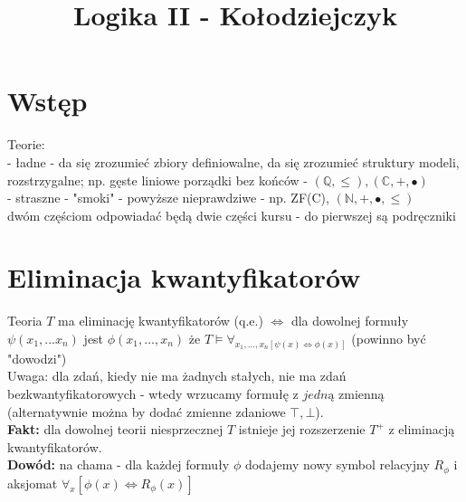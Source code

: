 \documentclass[12pt]{article}
\title{\textbf{Logika II - Ko\l odziejczyk}}
\date{}
\begin{document}
\maketitle
\setlength{\parindent}{0cm}



\newcommand{\M}{\mathfrak{M}}
\newcommand{\N}{\mathbb{N}}
\newcommand{\X}{\mathcal{X}}
\newcommand{\ind}{\setlength{\parindent}{1cm}  \indent \setlength{\parindent}{0cm}}
\newcommand{\sss}{\mathbb{S}}
\newcommand{\U}{\mathcal{U}}
\newcommand{\Q}{\mathbb{Q}}
\newcommand{\C}{\mathbb{C}}
\newcommand{\om}{\omega}



\section{Wstęp}

Teorie:\\
- ładne - da się zrozumieć zbiory definiowalne, da się zrozumieć struktury modeli, rozstrzygalne; np. gęste liniowe porządki bez końców - $(\Q, \leq), (\C,+, \bullet)$ \\
- straszne - "smoki" - powyższe nieprawdziwe - np. ZF(C), $(\N, +, \bullet, \leq)$\\

dwóm częściom odpowiadać będą dwie części kursu - do pierwszej są podręczniki












\section{Eliminacja kwantyfikatorów}
Teoria $T$ ma eliminację kwantyfikatorów (q.e.) $\iff$ dla dowolnej formuły $\psi(x_1,...x_n)$ jest $\phi(x_1,...,x_n)$ że $T\models \forall_{x_1,...,x_n[\psi(x)\iff\phi(x)]}$ (powinno być "dowodzi")\\

Uwaga: dla zdań, kiedy nie ma żadnych stałych, nie ma zdań bezkwantyfikatorowych - wtedy wrzucamy formułę z $jedną$ zmienną (alternatywnie można by dodać zmienne zdaniowe $\top, \bot$).\\

\textbf{Fakt:} dla dowolnej teorii niesprzecznej $T$ istnieje jej rozszerzenie $T^+$ z eliminacją kwantyfikatorów.\\

\textbf{Dowód:} na chama - dla każdej formuły $\phi$ dodajemy nowy symbol relacyjny $R_{\phi}$ i aksjomat $\forall_{x}[\phi(x)\iff R_{\phi}(x)]$\\
\end{document}
